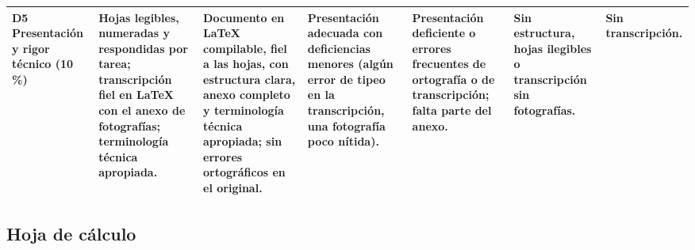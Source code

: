 \documentclass[11pt]{article}
\newcommand{\subseccion}[1]{\subsection{\textcolor{midblue}{#1}}}
\begin{document}
\begin{landscape}
{\begin{longtable}{|L{2.6cm}|L{4.3cm}|L{3.5cm}|L{3.2cm}|L{3.2cm}|L{3.0cm}|L{1.8cm}|}
			\hline

			\textbf{D5 Presentación y rigor técnico} (10\,\%) & Hojas legibles, numeradas y respondidas por tarea; transcripción fiel en \LaTeX{} con el anexo de fotografías; terminología técnica apropiada. & Documento en \LaTeX{} compilable, fiel a las hojas, con estructura clara, anexo completo y terminología técnica apropiada; sin errores ortográficos en el original. & Presentación adecuada con deficiencias menores (algún error de tipeo en la transcripción, una fotografía poco nítida). & Presentación deficiente o errores frecuentes de ortografía o de transcripción; falta parte del anexo. & Sin estructura, hojas ilegibles o transcripción sin fotografías. & Sin transcripción.\\

			\hline

		\end{longtable}

	}

\end{landscape}



\subseccion{Hoja de cálculo}
\end{document}
